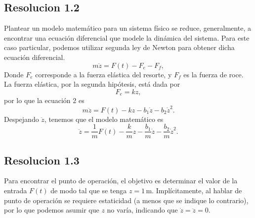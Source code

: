 \documentclass[
  11pt,
  letterpaper,
   addpoints,
   answers
  ]{exam}
\begin{document}
\begin{questions}
\begin{solution}
\subsection*{Resolucion 1.2}
Plantear un modelo matemático para un sistema físico se reduce, generalmente, a encontrar una ecuación diferencial que modele la dinámica del sistema. Para este caso particular, podemos utilizar segunda ley de Newton para obtener dicha ecuación diferencial.
\begin{equation}
    m\ddot{z} = F(t) - F_e - F_f, \tag{2}
\end{equation}
Donde $F_e$ corresponde a la fuerza elástica del resorte, y $F_f$ es la fuerza de roce. La fuerza elástica, por la segunda hipótesis, está dada por
\begin{equation}
    F_e = kz, \tag{3}
\end{equation}
por lo que la ecuación 2 es
\begin{equation}
    m\ddot{z} = F(t) - kz - b_1\dot{z} - b_2\dot{z}^2. \tag{4}
\end{equation}
Despejando $\ddot{z}$, tenemos que el modelo matemático es
\begin{equation}
    \ddot{z} = \frac{1}{m}F(t) - \frac{k}{m}z - \frac{b_1}{m}\dot{z} - \frac{b_2}{m}\dot{z}^2. \tag{5}
\end{equation}
\subsection*{Resolucion 1.3}
Para encontrar el punto de operación, el objetivo es determinar el valor de la entrada $F(t)$ de modo tal que se tenga $z = 1 \, \text{m}$. Implícitamente, al hablar de punto de operación se requiere estaticidad (a menos que se indique lo contrario), por lo que podemos asumir que $z$ no varía, indicando que $\dot{z} = \ddot{z} = 0$.


\end{solution}
\end{questions}
\end{document}
